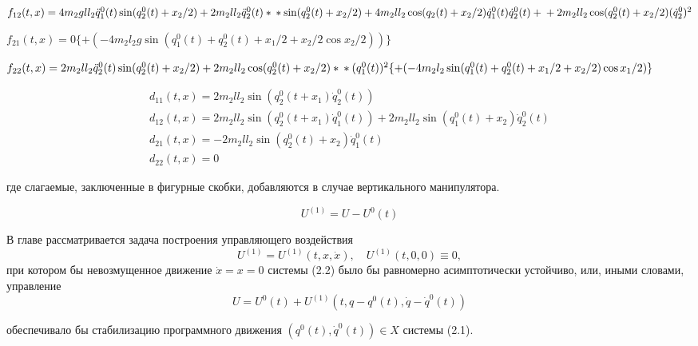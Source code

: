 $f_{12}(t,x) = 4 m_2 g l l_2 \ddot q_1^0 (t) \sin (q_2^0 (t) + x_2 / 2) + 2 m_2 l l_2 \ddot q_2^0 (t) * \\ 
* \sin (q_2^0 (t) + x_2 / 2) + 4 m_2 l l_2 \cos (q_2(t) + x_2 / 2) \dot q_1^0 (t) \dot q_2^0 (t) + \\ 
+ 2 m_2 l l_2 \cos (q_2^0 (t) + x_2 / 2) (\dot q_2^0)^2$

$f_{21}(t,x) = 0 \{ + (-4 m_2 l_2 g \sin (q_1^0 (t) + q_2^0 (t) + x_1 /2 + x_2 / 2 \cos x_2 / 2)) \}$

$f_{22}(t,x) = 2 m_2 l l_2 \ddot q_2^0 (t) \sin (q_2^0 (t) + x_2 / 2) + 2 m_2 l l_2 \cos (q_2^0 (t) + x_2 /2) * \\ 
* (q_1^0 (t))^2 \{ + (-4 m_2 l_2 \sin (q_1^0 (t) + q_2^0 (t) + x_1 / 2 + x_2 /2) \cos x_1 /2) \}$

$$
\begin{array}{l}
d_{11}(t, x) = 2 m_2 l l_2 \sin(q_2^0 (t + x_1) \dot q_2^0 (t)) \\
d_{12}(t, x) = 2 m_2 l l_2 \sin(q_2^0 (t + x_1) \dot q_1^0 (t)) + 2 m_2 l l_2 \sin(q_1^0 (t) + x_2) \dot q_2^0 (t) \\
d_{21}(t, x) = - 2 m_2 l l_2 \sin (q_2^0 (t) + x_2) \dot q_1^0 (t) \\
d_{22}(t, x) = 0
\end{array}
$$

где слагаемые, заключенные в фигурные скобки, добавляются в случае вертикального манипулятора.

$$ U^{(1)} = U - U^{0}(t) $$

В главе рассматривается задача построения управляющего воздействия $$ U^{(1)} = U^{(1)}(t, x, \dot x), \quad U^{(1)} (t, 0, 0) \equiv 0, $$ при котором бы невозмущенное движение $\dot x = x = 0$  системы (2.2) было бы равномерно асимптотически устойчиво, или, иными словами, управление $$U = U^0(t) + U^{(1)}(t, q-q^0(t), \dot q - \dot q^0(t))$$

обеспечивало бы стабилизацию программного движения $(q^0(t), \dot q^0(t)) \in X$  системы (2.1).